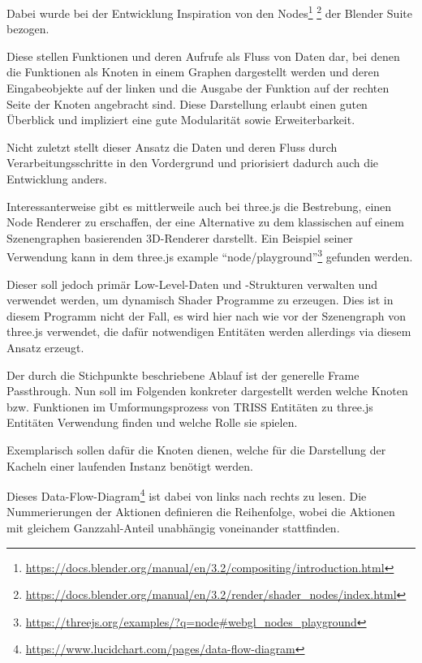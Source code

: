 Dabei wurde bei der Entwicklung Inspiration von den Nodes\footnote{\url{https://docs.blender.org/manual/en/3.2/compositing/introduction.html}} \footnote{\url{
https://docs.blender.org/manual/en/3.2/render/shader_nodes/index.html}} der Blender Suite bezogen.

Diese stellen Funktionen und deren Aufrufe als Fluss von Daten dar, bei denen die Funktionen als Knoten in einem Graphen dargestellt werden und deren Eingabeobjekte auf der linken und die Ausgabe der Funktion auf der rechten Seite der Knoten angebracht sind.
Diese Darstellung erlaubt einen guten Überblick und impliziert eine gute Modularität sowie Erweiterbarkeit.

Nicht zuletzt stellt dieser Ansatz die Daten und deren Fluss durch Verarbeitungsschritte in den Vordergrund und priorisiert dadurch auch die Entwicklung anders.

Interessanterweise gibt es mittlerweile auch bei three.js die Bestrebung, einen Node Renderer zu erschaffen, der eine Alternative zu dem klassischen auf einem Szenengraphen basierenden 3D-Renderer darstellt.
Ein Beispiel seiner Verwendung kann in dem three.js example \enquote{node/playground}\footnote{\url{https://threejs.org/examples/?q=node\#webgl\_nodes\_playground}} gefunden werden.

Dieser soll jedoch primär Low-Level-Daten und -Strukturen verwalten und verwendet werden, um dynamisch Shader Programme zu erzeugen.
Dies ist in diesem Programm nicht der Fall, es wird hier nach wie vor der Szenengraph von three.js verwendet, die dafür notwendigen Entitäten werden allerdings via diesem Ansatz erzeugt.

Der durch die Stichpunkte beschriebene Ablauf ist der generelle Frame Passthrough.
Nun soll im Folgenden konkreter dargestellt werden welche Knoten bzw. Funktionen im Umformungsprozess von TRISS Entitäten zu three.js Entitäten Verwendung finden und welche Rolle sie spielen.

Exemplarisch sollen dafür die Knoten dienen, welche für die Darstellung der Kacheln einer laufenden Instanz benötigt werden.

Dieses Data-Flow-Diagram\footnote{\url{https://www.lucidchart.com/pages/data-flow-diagram}} ist dabei von links nach rechts zu lesen.
Die Nummerierungen der Aktionen definieren die Reihenfolge, wobei die Aktionen mit gleichem Ganzzahl-Anteil unabhängig voneinander stattfinden.

